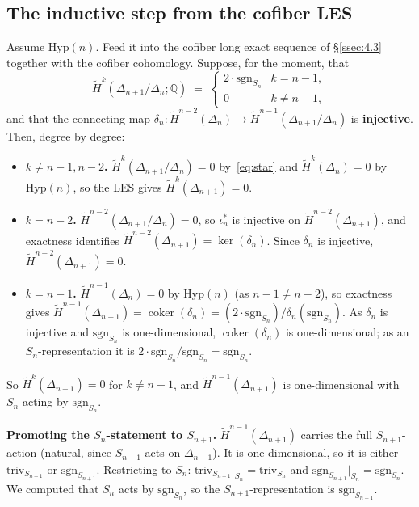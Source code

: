 \documentclass[11pt,reqno]{amsart}
\theoremstyle{plain}
\theoremstyle{definition}
\newcommand{\Hred}{\widetilde H}
\newcommand{\sgn}{\mathrm{sgn}}
\newcommand{\triv}{\mathrm{triv}}
\newcommand{\Q}{\mathbb{Q}}
\newcommand{\Hyp}{\mathrm{Hyp}}
\begin{document}
\subsection{The inductive step from the cofiber LES}\label{ssec:6.2}
Assume $\Hyp(n)$. Feed it into the cofiber long exact sequence of
\S\ref{ssec:4.3} together with the cofiber cohomology. Suppose, for the
moment, that
\begin{equation}\label{eq:star}
  \Hred^k(\Delta_{n+1}/\Delta_n;\Q)\;=\;
   \begin{cases} 2\cdot\sgn_{S_n} & k=n-1,\\ 0 & k\ne n-1, \end{cases}
\end{equation}
and that the connecting map
$\delta_n:\Hred^{n-2}(\Delta_n)\to\Hred^{n-1}(\Delta_{n+1}/\Delta_n)$
is \textbf{injective}. Then, degree by degree:
\begin{itemize}[leftmargin=1.6em]
  \item \textbf{$k\ne n-1,n-2$.} $\Hred^k(\Delta_{n+1}/\Delta_n)=0$
        by~\eqref{eq:star} and $\Hred^k(\Delta_n)=0$ by $\Hyp(n)$, so
        the LES gives $\Hred^k(\Delta_{n+1})=0$.
  \item \textbf{$k=n-2$.} $\Hred^{n-2}(\Delta_{n+1}/\Delta_n)=0$, so
        $\iota_n^*$ is injective on $\Hred^{n-2}(\Delta_{n+1})$, and
        exactness identifies $\Hred^{n-2}(\Delta_{n+1})=\ker(\delta_n)$.
        Since $\delta_n$ is injective, $\Hred^{n-2}(\Delta_{n+1})=0$.
  \item \textbf{$k=n-1$.} $\Hred^{n-1}(\Delta_n)=0$ by $\Hyp(n)$ (as
        $n-1\ne n-2$), so exactness gives
        $\Hred^{n-1}(\Delta_{n+1})=\operatorname{coker}(\delta_n)
        =(2\cdot\sgn_{S_n})/\delta_n(\sgn_{S_n})$. As $\delta_n$ is
        injective and $\sgn_{S_n}$ is one-dimensional,
        $\operatorname{coker}(\delta_n)$ is one-dimensional; as an
        $S_n$-representation it is
        $2\cdot\sgn_{S_n}/\sgn_{S_n}=\sgn_{S_n}$.
\end{itemize}
So $\Hred^k(\Delta_{n+1})=0$ for $k\ne n-1$, and
$\Hred^{n-1}(\Delta_{n+1})$ is one-dimensional with $S_n$ acting by
$\sgn_{S_n}$.

\smallskip
\noindent\textbf{Promoting the $S_n$-statement to $S_{n+1}$.}
$\Hred^{n-1}(\Delta_{n+1})$ carries the full $S_{n+1}$-action (natural,
since $S_{n+1}$ acts on $\Delta_{n+1}$). It is one-dimensional, so it is
either $\triv_{S_{n+1}}$ or $\sgn_{S_{n+1}}$. Restricting to $S_n$:
$\triv_{S_{n+1}}|_{S_n}=\triv_{S_n}$ and
$\sgn_{S_{n+1}}|_{S_n}=\sgn_{S_n}$. We computed that $S_n$ acts by
$\sgn_{S_n}$, so the $S_{n+1}$-representation is $\sgn_{S_{n+1}}$.
\end{document}
